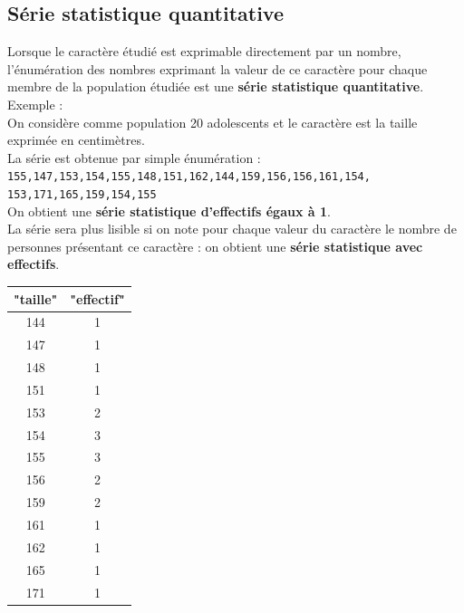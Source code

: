 \documentclass[a4paper,11pt]{book}
\begin{document}
\subsection{S\'erie statistique quantitative}
Lorsque le caract\`ere \'etudi\'e est exprimable directement par un nombre, 
l'\'enum\'eration des nombres exprimant la valeur de ce caract\`ere pour chaque
membre de la population \'etudi\'ee est une 
{\bf s\'erie statistique quantitative}.\\
Exemple :\\
On consid\`ere comme population 20 adolescents et le caract\`ere est la taille
exprim\'ee en centim\`etres.\\
La s\'erie est obtenue par simple \'enum\'eration : \\
{\tt 155,147,153,154,155,148,151,162,144,159,156,156,161,154,\\153,171,165,159,154,155}\\
On obtient une {\bf s\'erie statistique d'effectifs \'egaux \`a 1}.\\
La s\'erie sera plus lisible si on note pour chaque valeur du caract\`ere le 
nombre de personnes pr\'esentant ce caract\`ere : on obtient une 
{\bf s\'erie statistique avec effectifs}.\\
\begin{center}
\begin{tabular}{|c|c|}
\hline
"taille"&"effectif"\\
\hline
144&1\\
147&1\\
148&1\\
151&1\\
153&2\\
154&3\\
155&3\\
156&2\\
159&2\\
161&1\\
162&1\\
165&1\\
171&1\\
\hline
\end{tabular}
\end{center}
\end{document}

